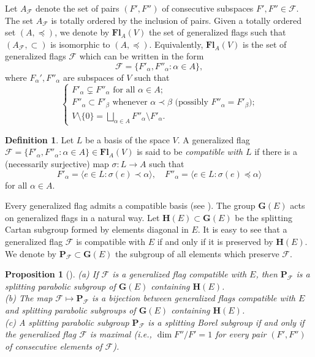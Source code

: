 \documentclass[12pt]{amsart}
\newtheorem{proposition}{Proposition}
\theoremstyle{definition}
\newtheorem{definition}{Definition}
\begin{document}
Let $A_\mathcal{F}$ denote the set of pairs $(F',F'')$ of consecutive subspaces $F',F''\in\mathcal{F}$. The set $A_\mathcal{F}$ is totally ordered by the inclusion of pairs.
Given a totally ordered set $(A,\preceq)$,
we denote by $\mathbf{Fl}_A(V)$ the set of generalized flags such that $(A_\mathcal{F},\subset)$ is isomorphic to $(A,\preceq)$.
Equivalently, $\mathbf{Fl}_A(V)$ is the set of generalized flags $\mathcal{F}$ which can be written in the form
\begin{equation}
\label{notation-Fa1}
\mathcal{F}=\{F'_\alpha,F''_\alpha:\alpha\in A\},
\end{equation}
where $F_\alpha',F''_\alpha$ are subspaces of $V$ such that
\begin{equation}
\label{notation-Fa}
\left\{
\begin{array}{l}
\mbox{$F'_\alpha\varsubsetneq F''_\alpha$ for all $\alpha\in A$;}\\[1mm]
\mbox{$F''_\alpha\subset F'_\beta$ whenever $\alpha\prec \beta$ (possibly $F''_\alpha=F'_\beta$);}\\[1mm]
\mbox{$V\setminus \{0\}=\bigsqcup_{\alpha\in A}F''_\alpha\setminus F'_\alpha$.}
\end{array}\right.
\end{equation}

\begin{definition}
\label{definition-3}
Let $L$ be a basis of the space $V$. A generalized flag $\mathcal{F}=\{F'_\alpha,F''_\alpha:\alpha\in A\}\in\mathbf{Fl}_A(V)$ is said to be {\it compatible with $L$} if there is a (necessarily surjective) map $\sigma:L\to A$ such that
\[F'_\alpha=\langle e\in L:\sigma(e)\prec\alpha\rangle,\quad F''_\alpha=\langle e\in L:\sigma(e)\preceq\alpha\rangle\]
for all $\alpha\in A$.
\end{definition}


Every generalized flag admits a compatible basis (see \cite[Proposition 4.1]{DP}).
The group $\mathbf{G}(E)$  acts on generalized flags in a natural way.
Let $\mathbf{H}(E)\subset\mathbf{G}(E)$ be the splitting Cartan subgroup formed by elements diagonal in $E$.
It is easy to see that a generalized flag $\mathcal{F}$ is compatible with $E$ if and only if it is preserved by $\mathbf{H}(E)$.
We denote by $\mathbf{P}_{\mathcal{F}}\subset\mathbf{G}(E)$ the subgroup of all elements which preserve $\mathcal{F}$.

\begin{proposition}[\cite{DP1,DP}]
\label{proposition-1}
{\rm (a)} If $\mathcal{F}$ is a generalized flag compatible with $E$, then $\mathbf{P}_{\mathcal{F}}$ is a splitting parabolic subgroup of $\mathbf{G}(E)$ containing $\mathbf{H}(E)$.  \\
{\rm (b)} The map $\mathcal{F}\mapsto\mathbf{P}_{\mathcal{F}}$ is a bijection between generalized flags compatible with $E$ and splitting parabolic subgroups of $\mathbf{G}(E)$ containing $\mathbf{H}(E)$. \\
{\rm (c)} A splitting parabolic subgroup $\mathbf{P}_\mathcal{F}$ is a splitting Borel subgroup if and only if the generalized flag $\mathcal{F}$ is maximal
(i.e., $\dim F''/F'=1$ for every pair $(F',F'')$ of consecutive elements of $\mathcal{F}$). \end{proposition}
\end{document}
